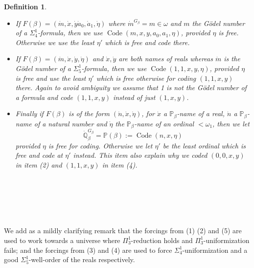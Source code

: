 \documentclass[a4paper,11pt]{article}
\newtheorem{definition}[theorem]{Definition}
\newcommand{\forceP}{\mathbb{P}}
\newcommand{\forceQ}{\mathbb{Q}}
\begin{document}
\begin{definition}
\begin{itemize}
\item[(3)] If $F(\beta)= ( \dot{m}, \dot{x}, \dot{y}\dot{a}_0, \dot{a}_1,\dot{\eta}) $ where $\dot{m}^{G_{\beta}}=m \in \omega$ and $m$ the G\"odel number of a $\Sigma^1_4$-formula, then we use $\operatorname{Code} (m,{x},{y}, a_0,a_1,\eta)$, provided $\eta$ is free. Otherwise we use the least $\eta'$ which is free and code there.

\item[(4)] If $F(\beta)= (  \dot{m},\dot{x},\dot{y}, \dot{\eta} )$ and $\dot{x},\dot{y}$ are both names of reals whereas $\dot{m}$ is the G\"odel number of a $\Sigma^1_5$-formula, then we use $\operatorname{Code} (1,1,x,y,\eta)$, provided $\eta$ is free and use the least $\eta'$ which is free otherwise for coding $(1,1,x,y)$ there. Again to avoid ambiguity we assume that 1 is not the G\"odel number of a formula and code $(1,1,x,y)$ instead of just $(1,x,y)$.

    \item[(5)] Finally if $F(\beta)$ is of the form $( \dot{n},\dot{x},\dot{\eta})$, for $\dot{x}$ a $\forceP_{\beta}$-name of a real, $\dot{n}$ a $\forceP_{\beta}$-name of a natural number and $\dot{\eta}$ the $\forceP_{\beta}$-name of an ordinal $<\omega_1$, then we let
    \[\dot{\forceQ}_{\beta}^{G_{\beta}}= \forceP (\beta) := \operatorname{Code}(n,x,\eta) \]
    provided $\eta$ is free for coding. Otherwise we let $\eta'$ be the least ordinal which is free and code at $\eta'$ instead. This item also explain why we coded $(0,0,x,y)$ in item (2) and $(1,1,x,y)$ in item (4).
    ﻿
     
    ﻿
    ﻿
     \end{itemize}
    ﻿
     
    ﻿
    \end{definition}
 We add as a mildly clarifying remark that the forcings from (1) (2) and (5) are used to work towards a universe where $\Pi^1_3$-reduction holds and $\Pi^1_3$-uniformization fails; and the forcings from (3) and (4) are used to force $\Sigma^1_4$-uniformization and a good $\Sigma^1_5$-well-order of the reals respectively.
    ﻿
    
\end{document}
